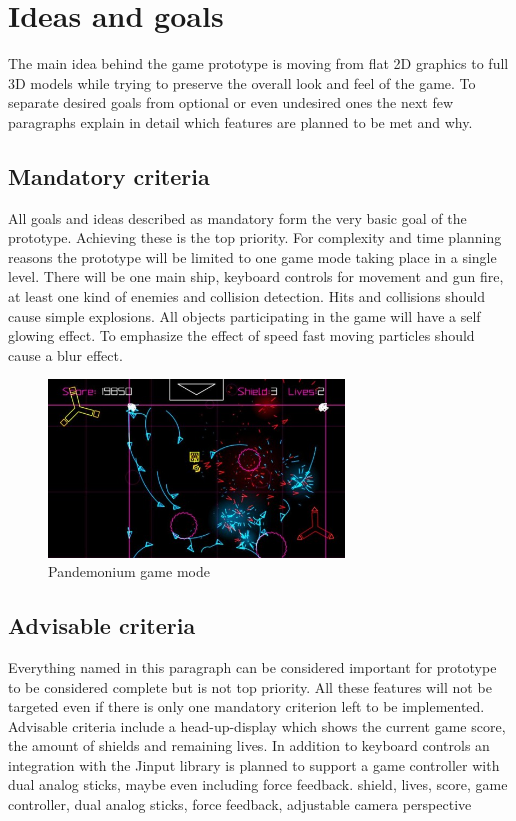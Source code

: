 \documentclass[a4paper]{article}
\begin{document}
\section*{Ideas and goals}
The main idea behind the game prototype is moving from flat 2D graphics to full 3D models while trying to preserve the overall look and feel of the game. To separate desired goals from optional or even undesired ones the next few paragraphs explain in detail which features are planned to be met and why.

\subsection*{Mandatory criteria}
All goals and ideas described as mandatory form the very basic goal of the prototype. Achieving these is the top priority. For complexity and time planning reasons the prototype will be limited to one game mode taking place in a single level. There will be one main ship, keyboard controls for movement and gun fire, at least one kind of enemies and collision detection. Hits and collisions should cause simple explosions. All objects participating in the game will have a self glowing effect. To emphasize the effect of speed fast moving particles should cause a blur effect.

\begin{figure}[htbp]
\centering
\includegraphics[width=0.7\textwidth]{4dd9c__pewpew-for-android-550x330.jpg}
\caption{Pandemonium game mode}
\end{figure}

\subsection*{Advisable criteria}
Everything named in this paragraph can be considered important for prototype to be considered complete but is not top priority. All these features will not be targeted even if there is only one mandatory criterion left to be implemented. Advisable criteria include a head-up-display which shows the current game score, the amount of shields and remaining lives. In addition to keyboard controls an integration with the Jinput library is planned to support a game controller with dual analog sticks, maybe even including force feedback.
shield, lives, score, game controller, dual analog sticks, force feedback, adjustable camera perspective
\end{document}
